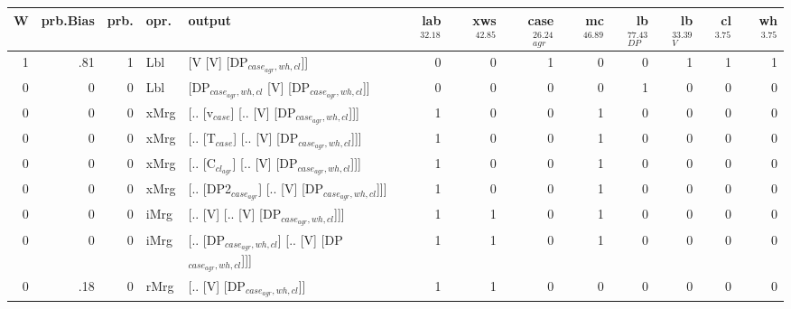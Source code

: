 \begin{tabularx}{\linewidth}{rrrlXrrrrrrrr}
\hline
   W &   prb.Bias &   prb. & opr.   & output                                                &   lab$^{32.18}$ &   xws$^{42.85}$ &   case$_{agr}^{26.24}$ &   mc$^{46.89}$ &   lb$_{DP}^{77.43}$ &   lb$_{V}^{33.39}$ &   cl$^{3.75}$ &   wh$^{3.75}$ \\
\hline
   1 &       .81 &   1 & Lbl  & [V [V] [DP$_{case_{agr},wh,cl}$]]                           &             0 &             0 &                  1 &            0 &               0 &              1 &        1 &        1 \\
   0 &       0 &   0 & Lbl  & [DP$_{case_{agr},wh,cl}$ [V] [DP$_{case_{agr},wh,cl}$]]           &             0 &             0 &                  0 &            0 &               1 &              0 &        0 &        0 \\
   0 &       0 &   0 & xMrg & [.. [v$_{case}$] [.. [V] [DP$_{case_{agr},wh,cl}$]]]            &             1 &             0 &                  0 &            1 &               0 &              0 &        0 &        0 \\
   0 &       0 &   0 & xMrg & [.. [T$_{case}$] [.. [V] [DP$_{case_{agr},wh,cl}$]]]            &             1 &             0 &                  0 &            1 &               0 &              0 &        0 &        0 \\
   0 &       0 &   0 & xMrg & [.. [C$_{cl_{agr}}$] [.. [V] [DP$_{case_{agr},wh,cl}$]]]          &             1 &             0 &                  0 &            1 &               0 &              0 &        0 &        0 \\
   0 &       0 &   0 & xMrg & [.. [DP2$_{case_{agr}}$] [.. [V] [DP$_{case_{agr},wh,cl}$]]]      &             1 &             0 &                  0 &            1 &               0 &              0 &        0 &        0 \\
   0 &       0 &   0 & iMrg & [.. [V] [.. [V] [DP$_{case_{agr},wh,cl}$]]]                 &             1 &             1 &                  0 &            1 &               0 &              0 &        0 &        0 \\
   0 &       0 &   0 & iMrg & [.. [DP$_{case_{agr},wh,cl}$] [.. [V] [DP$_{case_{agr},wh,cl}$]]] &             1 &             1 &                  0 &            1 &               0 &              0 &        0 &        0 \\
   0 &       .18 &   0 & rMrg & [.. [V] [DP$_{case_{agr},wh,cl}$]]                          &             1 &             1 &                  0 &            0 &               0 &              0 &        0 &        0 \\
\hline
\end{tabularx}\endgroup\\

